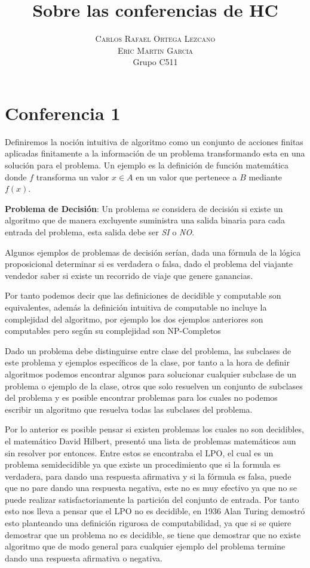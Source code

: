 \documentclass[]{article}
\title{Sobre las conferencias de HC} %
\author{%
\textsc{Carlos Rafael Ortega Lezcano}\\[1ex]
\textsc{Eric Martin Garcia} \\[1ex]
\normalsize Grupo C511 \\ %
}
\date{}
\begin{document}
\maketitle


\section*{Conferencia 1}

Definiremos la noci\'on intuitiva de algoritmo como un conjunto de acciones finitas aplicadas finitamente a la informaci\'on de un problema transformando esta en una soluci\'on para el problema. Un ejemplo es la definici\'on de funci\'on matem\'atica donde $f$ transforma un valor $x \in A$ en un valor que pertenece a $B$ mediante $f(x)$.

\textbf{Problema de Decisi\'on}: Un problema se considera de decisi\'on si existe un algoritmo que de manera excluyente suministra una salida binaria para cada entrada del problema, esta salida debe ser \textit{SI} o \textit{NO}.

Algunos ejemplos de problemas de decisi\'on ser\'ian, dada una f\'ormula de la l\'ogica proposicional determinar si es verdadera o falsa, dado el problema del viajante vendedor saber si existe un recorrido de viaje que genere ganancias. 

Por tanto podemos decir que las definiciones de decidible y computable son equivalentes, adem\'as la definici\'on intuitiva de computable no incluye la complejidad del algoritmo, por ejemplo los dos ejemplos anteriores son computables pero seg\'un su complejidad son NP-Completos

Dado un problema debe distinguirse entre clase del problema, las subclases de este problema y ejemplos espec\'ificos de la clase, por tanto a la hora de definir algoritmos podemos encontrar algunos para solucionar cualquier subclase de un problema o ejemplo de la clase, otros que solo resuelven un conjunto de subclases del problema y es posible encontrar problemas para los cuales no podemos escribir un algoritmo que resuelva todas las subclases del problema.

Por lo anterior es posible pensar si existen problemas los cuales no son decidibles, el matem\'atico David Hilbert, present\'o una lista de problemas matem\'aticos aun sin resolver por entonces. Entre estos se encontraba el LPO, el cual es un problema semidecidible ya que existe un procedimiento que si la formula es verdadera, para dando una respuesta afirmativa y si la f\'ormula es falsa, puede que no pare dando una respuesta negativa, este no es muy efectivo ya que no se puede realizar satisfactoriamente la partici\'on del conjunto de entrada. Por tanto esto nos lleva a pensar que el LPO no es decidible, en 1936 Alan Turing demostr\'o esto planteando una definici\'on rigurosa de computabilidad, ya que si se quiere demostrar que un problema no es decidible, se tiene que demostrar que no existe algoritmo que de modo general para cualquier ejemplo del problema termine dando una respuesta afirmativa o negativa.
\end{document}
